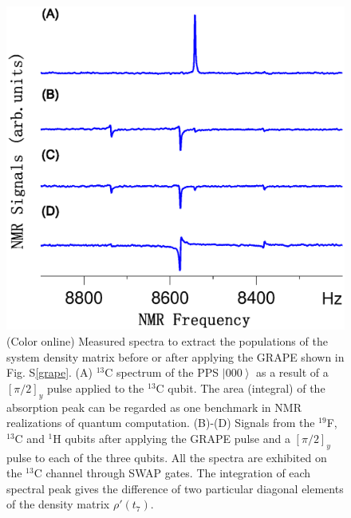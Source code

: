 \documentclass[twocolumn,showpacs,twoside,10pt,prl]{revtex4}
\begin{document}
\begin{figure}[h]
\includegraphics[width=0.95\columnwidth]{signal.eps}
\centering
\caption{\footnotesize{(Color online) Measured spectra to extract the populations of the system density matrix before or after applying the GRAPE shown in Fig. S\ref{grape}.
(A) $^{13}$C spectrum of the PPS $\left\vert 000 \right\rangle$ as a result of a $[\pi/2]_y$ pulse applied to the $^{13}$C qubit.
The area (integral) of the absorption peak can be regarded as one benchmark in NMR realizations of
quantum computation. (B)-(D) Signals from the $^{19}$F, $^{13}$C and $^1$H qubits after applying the GRAPE pulse and a $[\pi/2]_y$ pulse to each of the three qubits. All the spectra are exhibited on the $^{13}$C channel through SWAP gates. The integration of each spectral peak gives the difference of two particular diagonal elements of the density matrix $\rho'(t_7)$.}}
\label{signal}
\end{figure}
\end{document}
